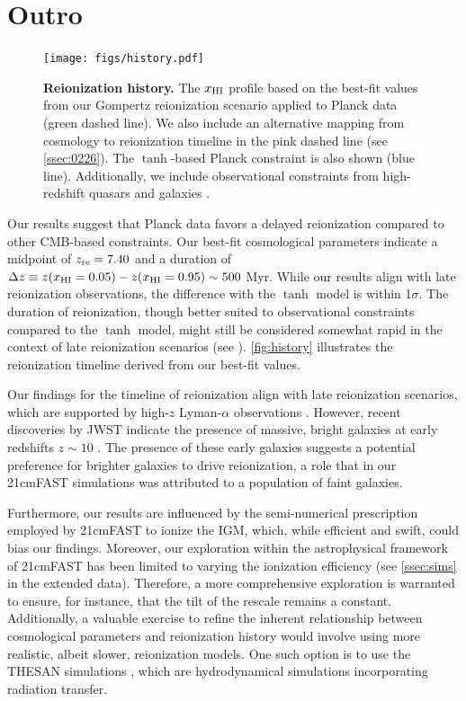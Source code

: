\section*{Outro}

\begin{figure}
\centering
\texttt{[image: figs/history.pdf]}
\caption{\textbf{Reionization history.}
The $x_{\mathrm{HI}}$ profile based on the best-fit values from our Gompertz
reionization scenario applied to Planck data (green dashed line).
We also include an alternative mapping from cosmology to reionization
timeline in the pink dashed line (see \ref{ssec:0226}).
The $\tanh$-based Planck constraint is also shown (blue line).
Additionally, we include observational constraints from high-redshift
quasars \cite{Greig2017, Banados2018, Davies2018, Greig2019, Wang2020,
Yang2020, Greig2022, Jin2023} and galaxies \cite{Ouchi2010,
Sobacchi2015, Mason2018, Mason2019, Hoag2019, Mesinger2015}.}
\label{fig:history}
\end{figure}

Our results suggest that Planck data favors a delayed reionization
compared to other CMB-based constraints.
Our best-fit cosmological parameters indicate a midpoint of $z_{\mathrm{re}} =
7.40$ and a duration of $\Delta z \equiv z(x_{\mathrm{HI}} = 0.05) - z(x_{\mathrm{HI}} =
0.95) \sim 500 $ Myr.
While our results align with late reionization observations, the
difference with the $\tanh$ model is within 1$\sigma$.
The duration of reionization, though better suited to observational
constraints compared to the $\tanh$ model, might still be considered
somewhat rapid in the context of late reionization scenarios (see
\cite{Cain2021}).
\autoref{fig:history} illustrates the reionization timeline derived
from our best-fit values.

Our findings for the timeline of reionization align with late
reionization scenarios, which are supported by high-$z$ Lyman-$\alpha$
observations \cite{Keating2020, Cain2021}.
However, recent discoveries by JWST indicate the presence of massive,
bright galaxies at early redshifts $z \sim 10$
\cite{Adams2023, Bradley2023, Donnan2023}.
The presence of these early galaxies suggests a potential preference for
brighter galaxies to drive reionization, a role that in our 21cmFAST
simulations was attributed to a population of faint galaxies.

Furthermore, our results are influenced by the semi-numerical
prescription employed by 21cmFAST to ionize the IGM, which, while
efficient and swift, could bias our findings.
Moreover, our exploration within the astrophysical framework of 21cmFAST
has been limited to varying the ionization efficiency (see
\ref{ssec:sims} in the extended data).
Therefore, a more comprehensive exploration is warranted to ensure, for
instance, that the tilt of the rescale remains a constant.
Additionally, a valuable exercise to refine the inherent relationship
between cosmological parameters and reionization history would involve
using more realistic, albeit slower, reionization models.
One such option is to use the THESAN simulations \cite{Kannan2022},
which are hydrodynamical simulations incorporating radiation transfer.



